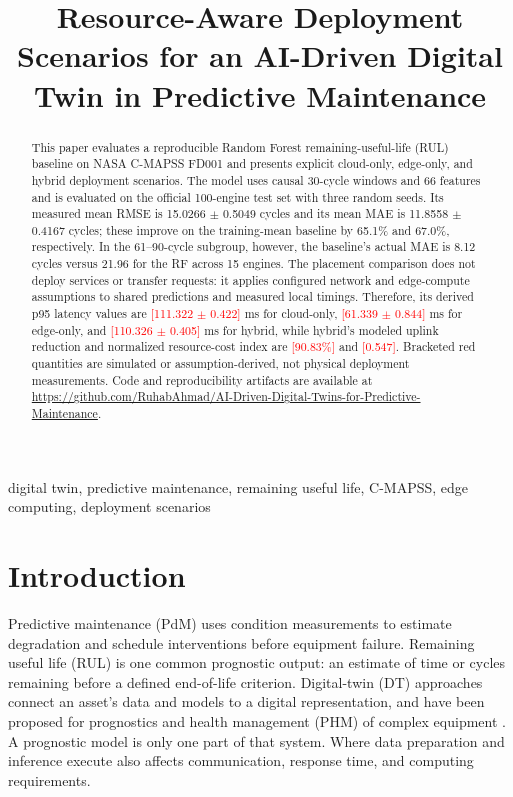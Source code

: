 ﻿\documentclass[conference]{IEEEtran}
\newcommand{\simval}[1]{\textcolor{red}{[#1]}}
\begin{document}
\title{Resource-Aware Deployment Scenarios for an AI-Driven Digital Twin in Predictive Maintenance}

\author{
}

\maketitle

\begin{abstract}
This paper evaluates a reproducible Random Forest remaining-useful-life (RUL) baseline on NASA C-MAPSS FD001 and presents explicit cloud-only, edge-only, and hybrid deployment scenarios. The model uses causal 30-cycle windows and 66 features and is evaluated on the official 100-engine test set with three random seeds. Its measured mean RMSE is 15.0266 $\pm$ 0.5049 cycles and its mean MAE is 11.8558 $\pm$ 0.4167 cycles; these improve on the training-mean baseline by 65.1\% and 67.0\%, respectively. In the 61--90-cycle subgroup, however, the baseline's actual MAE is 8.12 cycles versus 21.96 for the RF across 15 engines. The placement comparison does not deploy services or transfer requests: it applies configured network and edge-compute assumptions to shared predictions and measured local timings. Therefore, its derived p95 latency values are \simval{111.322 $\pm$ 0.422} ms for cloud-only, \simval{61.339 $\pm$ 0.844} ms for edge-only, and \simval{110.326 $\pm$ 0.405} ms for hybrid, while hybrid's modeled uplink reduction and normalized resource-cost index are \simval{90.83\%} and \simval{0.547}. Bracketed red quantities are simulated or assumption-derived, not physical deployment measurements. Code and reproducibility artifacts are available at \url{https://github.com/RuhabAhmad/AI-Driven-Digital-Twins-for-Predictive-Maintenance}.
\end{abstract}

\begin{IEEEkeywords}
digital twin, predictive maintenance, remaining useful life, C-MAPSS, edge computing, deployment scenarios
\end{IEEEkeywords}

\section{Introduction}
Predictive maintenance (PdM) uses condition measurements to estimate degradation and schedule interventions before equipment failure. Remaining useful life (RUL) is one common prognostic output: an estimate of time or cycles remaining before a defined end-of-life criterion. Digital-twin (DT) approaches connect an asset's data and models to a digital representation, and have been proposed for prognostics and health management (PHM) of complex equipment \cite{tao2018,toothman2023}. A prognostic model is only one part of that system. Where data preparation and inference execute also affects communication, response time, and computing requirements.
\end{document}
